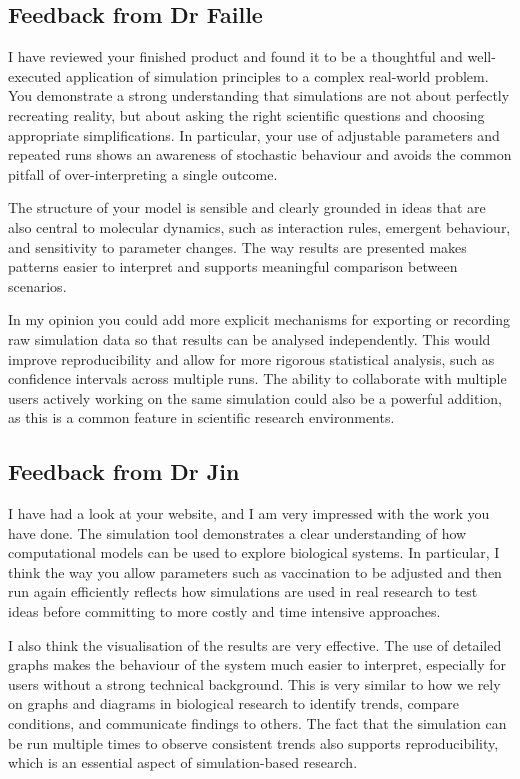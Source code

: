 \subsection*{Feedback from Dr Faille}

I have reviewed your finished product and found it to be a thoughtful and well-executed application of simulation principles to a complex real-world problem. You demonstrate a strong understanding that simulations are not about perfectly recreating reality, but about asking the right scientific questions and choosing appropriate simplifications. In particular, your use of adjustable parameters and repeated runs shows an awareness of stochastic behaviour and avoids the common pitfall of over-interpreting a single outcome.

The structure of your model is sensible and clearly grounded in ideas that are also central to molecular dynamics, such as interaction rules, emergent behaviour, and sensitivity to parameter changes. The way results are presented makes patterns easier to interpret and supports meaningful comparison between scenarios.

In my opinion you could add more explicit mechanisms for exporting or recording raw simulation data so that results can be analysed independently. This would improve reproducibility and allow for more rigorous statistical analysis, such as confidence intervals across multiple runs. The ability to collaborate with multiple users actively working on the same simulation could also be a powerful addition, as this is a common feature in scientific research environments.

\subsection*{Feedback from Dr Jin}

I have had a look at your website, and I am very impressed with the work you have done. The simulation tool demonstrates a clear understanding of how computational models can be used to explore biological systems. In particular, I think the way you allow parameters such as vaccination to be adjusted and then run again efficiently reflects how simulations are used in real research to test ideas before committing to more costly and time intensive approaches.

I also think the visualisation of the results are very effective. The use of detailed graphs makes the behaviour of the system much easier to interpret, especially for users without a strong technical background. This is very similar to how we rely on graphs and diagrams in biological research to identify trends, compare conditions, and communicate findings to others. The fact that the simulation can be run multiple times to observe consistent trends also supports reproducibility, which is an essential aspect of simulation-based research.

